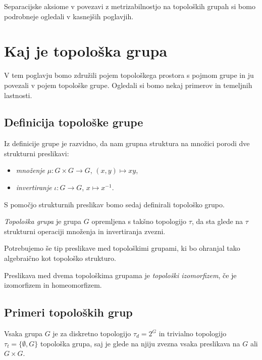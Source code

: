\documentclass[mat1]{fmfdelo}
\begin{document}
Separacijske aksiome v povezavi z metrizabilnostjo na topoloških grupah si bomo podrobneje ogledali v kasnejših poglavjih.

\section{Kaj je topološka grupa}
V tem poglavju bomo združili pojem topološkega prostora s pojmom grupe in ju povezali v pojem topološke grupe. Ogledali si bomo nekaj primerov in temeljnih lastnosti.

\subsection{Definicija topološke grupe}
Iz definicije grupe je razvidno, da nam grupna struktura na množici porodi dve strukturni preslikavi:
\begin{itemize}
\item \emph{množenje} $\mu\colon G \times G \to G$, $(x, y) \mapsto xy$,
\item \emph{invertiranje} $\iota\colon G \to G$, $x \mapsto x^{-1}$.
\end{itemize}

S pomočjo strukturnih preslikav bomo sedaj definirali topološko grupo.
\begin{definicija}\label{def:topgrupa}
\emph{Topološka grupa} je grupa $G$ opremljena s takšno topologijo $\tau$, da sta glede na $\tau$ strukturni operaciji množenja in invertiranja zvezni. 
\end{definicija}

Potrebujemo še tip preslikave med topološkimi grupami, ki bo ohranjal tako algebraično kot topološko strukturo.
\begin{definicija}\label{def:topizo}
Preslikava med dvema topološkima grupama je \emph{topološki izomorfizem}, če je izomorfizem in homeomorfizem.
\end{definicija}


\subsection{Primeri topoloških grup}

\begin{primer}
	Vsaka grupa $G$ je za diskretno topologijo $\tau_d = 2^G$ in trivialno topologijo $\tau_t = \lbrace \emptyset, G \rbrace$ topološka grupa, saj je glede na njiju zvezna vsaka preslikava na $G$ ali $G \times G$.
\end{primer}
\end{document}
